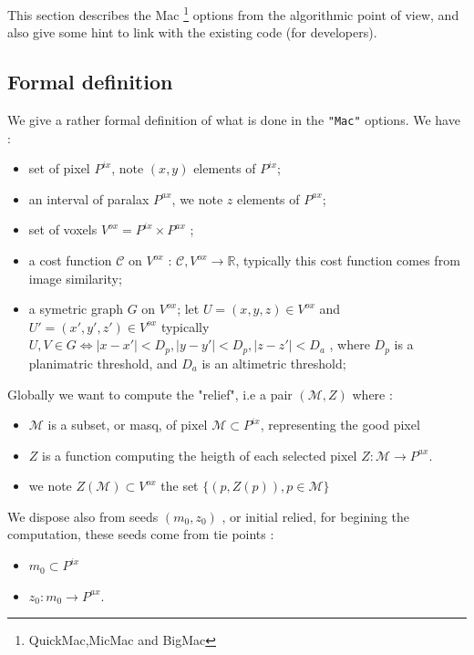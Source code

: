 This section describes the Mac \footnote{QuickMac,MicMac and BigMac}  options from
the algorithmic point of view, and also give some hint to link with the existing code
(for developers).

\subsection{Formal definition}

We give a rather formal definition of what is done in the {\tt "Mac"} options.  We have :

\begin{itemize}
   \item set of pixel $P^{ix}$, note $(x,y)$ elements of $P^{ix}$;
   \item an interval of paralax $P^{ax}$, we note $z$ elements of $P^{ax}$;
   \item set of voxels   $V^{ox}= P^{ix} \times P^{ax}$  ;
   \item a cost function $\mathcal{C}$  on $V^{ox}$   :  $ \mathcal{C}, V^{ox}  \rightarrow  \mathbb{R} $,
         typically this cost function comes from image similarity;
   \item a symetric graph $G$ on  $V^{ox}$; let $U=(x,y,z) \in V^{ox}$ and $U'=(x',y',z') \in V^{ox}$
         typically $U,V \in G \Leftrightarrow  |x-x'| < D_p ,  |y-y'| < D_p , |z-z'| < D_a  $ ,
          where $D_p$ is a planimatric threshold, and $D_a$ is an altimetric threshold;
  
\end{itemize}

Globally we want to compute the "relief", i.e a pair $(\mathcal{M},Z)$ where :

\begin{itemize}
   \item  $\mathcal{M}$ is a subset, or masq, of pixel $\mathcal{M} \subset P^{ix}$, 
         representing the good pixel
   \item $Z$ is a function computing the heigth of each selected pixel 
         $ Z : \mathcal{M} \rightarrow P^{ax}$.
   \item we note $Z(\mathcal{M}) \subset V^{ox}$ the set $\{(p,Z(p)) , p \in \mathcal{M} \}$
\end{itemize}

We dispose also from seeds $(m_0,z_0)$ , or initial relied, for begining the computation, 
these seeds come from  tie points :

\begin{itemize}
   \item $m_0 \subset P^{ix}$
   \item $z_0 : m_0 \rightarrow P^{ax}$.
\end{itemize}

